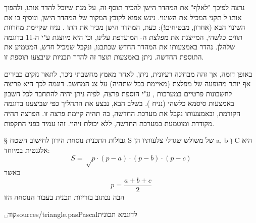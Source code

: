 נרצה לפיכך "לאלף" את המהדר הישן להכיר תוסף זה, על מנת שיוכל להדר אותו, ולהפוך אותו ל תקני המכיל את השינוי. ניגש אפוא לקובץ המקור של המהדר הישן, ונוסיף בו את השינוי הבא (אחרון, מבטיחים!):
כעת, המהדר הישן מכיר את התו . נניח שקיימת מחרוזת תווים כלשהי, המייצגת את מפלצת ה- המועדפת עלינו, וכי היא מיוצגת ע"י ה-11 בדוגמה שלהלן. נהדר באמצעותו את המהדר החדש שכתבנו, ונקבל   שמכיל  חדש, המטמיע את התוספת החדשה. ניתן באמצעות תוצר זה להדר תכניות שיבצעו תוספת זו.

באופן דומה, אך זהה מבחינה רעיונית, ניתן, לאחר מאמץ מחשבתי ניכר, לתאר נזקים כבירים אף יותר מהופעה של מפלצת (מאיימת ככל שתהיה) על צג המחשב. דוגמה לכך היא פריצה לחשבונות פרטיים במערכות , ע"י הוספת פרצה, לפיה ניתן יהיה להתחבר לכל חשבון באמצעות סיסמא כלשהי (נניח ). בשלב הבא, נבצע את התהליך כפי שביצענו בדוגמה הקודמת, ובאמצעותו נקבל את מערכת  החדשה, בה תהיה קיימת פרצה זו. הפרצה תהיה מקודדת ומוטמעת במערכת החדשה, ללא יכולת זיהוי. זהו  עמיד בפני התקפות.

§ גבולות התכנית
נוסחת הירון לחישוב השטח S של משולש שגדלי צלעותיו הן a, b וְ C היא אלגנטית במיוחד: \[
S=√{p·(p-a)·(p-b)·(p-c)}
\] כאשר \[
p=\frac{a+b+c}{2}
\] הבה נכתוב בזריזות תכנית  בעבור הנוסחה הזו

␣קוד{sources/triangle.pas}{Pascal}{לדוגמא תכונית}

